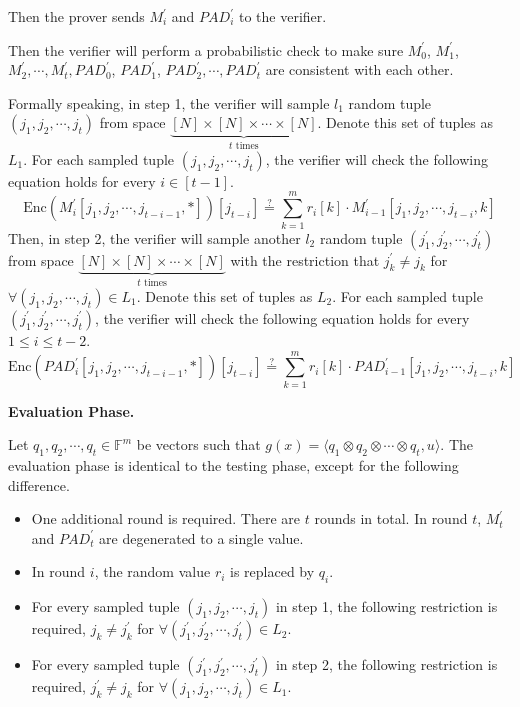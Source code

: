 Then the prover sends $M_i^{\prime}$ and $PAD_i^\prime$ to the verifier.


Then the verifier will perform a probabilistic check to make sure 
$M_0^\prime$, $M_1^\prime$, $M_2^\prime, \cdots, M_{t}^\prime, PAD_0^\prime$, $PAD_1^\prime$, $PAD_2^\prime, \cdots, PAD_{t}^\prime$ are consistent with each other.

Formally speaking, in step 1, the verifier will sample $l_1$ random tuple $(j_1, j_2, \cdots, j_t)$ from space $\underbrace{[N] \times [N] \times \cdots \times [N]}_{t \text{ times}}$. Denote this set of tuples as $L_1$.
For each sampled tuple $(j_1, j_2, \cdots, j_t)$, the verifier will check the following equation holds for every $i \in [t-1]$.
$$
    \text{Enc}(M_i^\prime[j_1, j_2, \cdots, j_{t-i-1}, *])[j_{t-i}] \stackrel{?}{=} \sum_{k=1}^m r_i[k] \cdot M_{i-1}^{\prime}[j_1,j_2, \cdots, j_{t-i},k]
$$
Then, in step 2, the verifier will sample another $l_2$ random tuple $(j_1^\prime, j_2^\prime, \cdots, j_t^\prime)$ from space $\underbrace{[N] \times [N] \times \cdots \times [N]}_{t \text{ times}}$ with the restriction that $j_k^\prime \neq j_k$ for $\forall (j_1, j_2, \cdots, j_t) \in L_1$. Denote this set of tuples as $L_2$.
For each sampled tuple $(j_1^\prime, j_2^\prime, \cdots, j_t^\prime)$, the verifier will check the following equation holds for every $1 \le i \le t-2$.
$$
    \text{Enc}(PAD_i^\prime[j_1, j_2, \cdots, j_{t-i-1}, *])[j_{t-i}] \stackrel{?}{=} \sum_{k=1}^m r_i[k] \cdot PAD_{i-1}^{\prime}[j_1,j_2, \cdots, j_{t-i},k]
$$

\textbf{Evaluation Phase.}

Let $q_1, q_2, \cdots, q_t \in \mathbb{F}^{m}$ be vectors such that $g(x) =\langle q_1 \otimes q_2 \otimes \cdots \otimes q_t, u \rangle $. The evaluation phase is identical to the testing phase, except for the following difference.

\begin{itemize}
    \item One additional round is required. There are $t$ rounds in total. In round $t$, $M_t^\prime$ and $ PAD_t^\prime$ are degenerated to a single value.

    \item In round $i$, the random value $r_i$ is replaced by $q_i$.
    
    \item For every sampled tuple $(j_1, j_2, \cdots, j_t)$ in step 1, the following restriction is required, $j_k \neq j_k^\prime$ for $\forall (j_1^\prime, j_2^\prime, \cdots, j_t^\prime) \in L_2$.

    \item For every sampled tuple $(j_1^\prime, j_2^\prime, \cdots, j_t^\prime)$ in step 2, the following restriction is required, $j_k^\prime \neq j_k$ for $\forall (j_1, j_2, \cdots, j_t) \in L_1$.
\end{itemize}

